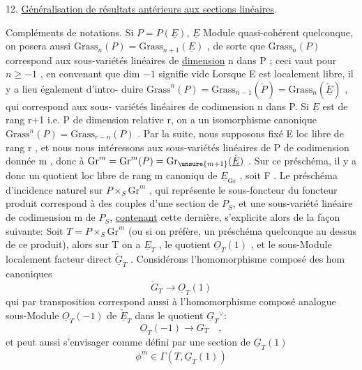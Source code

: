 
12. \uline{Généralisation de résultats antérieurs aux sections linéaires}.

Compléments de notations. Si $P = P(\underline{E})$, $\underline{E}$ Module quasi-cohérent
quelconque, on posera aussi $\mathrm{Grass}_n(P) = \mathrm{Grass}_{n+1}(\underline{E})$ , de sorte que
$\mathrm{Grass}_n(P)$ correspond aux sous-variétés linéaires de \uline{dimension} n dans
P ; ceci vaut pour $n \geq -1$ , en convenant que dim $-1$ signifie vide
Lorsque E est localement libre,  il y a lieu également d'intro-%
duire $\mathrm{Grass}^n(P) = \mathrm{Grass}_{n-1}(\check{P}) = \mathrm{Grass}_n(\check{\underline{E}})$ , qui correspond aux sous-%
variétés linéaires de codimension n dans P. Si $\underline{E}$ est de rang r+1 i.e.
P de dimension relative r, on a un isomorphisme canonique
$\mathrm{Grass}^n(P) = \mathrm{Grass}_{r-n}(P)$ . Par la suite, nous supposons fixé E loc
libre de rang r , et nous nous intéressons aux sous-variétés linéaires
de P de codimension donnée m , donc à $\mathrm{Gr}^m = \mathrm{Gr}^m(P) = \mathrm{Gr}_{\unsure{m+1}}(\check{\underline{E}})$ .
Sur ce préschéma, il y a donc un quotient  loc libre de rang m canoniqu
de $\underline{E}_{\mathrm{Gr}}$ , soit F .  Le préschéma d'incidence naturel
sur $P\times_S \mathrm{Gr}^m$ , qui représente le sous-foncteur du foncteur produit
correspond à des couples d'une section de $P_S$, et une sous-variété
linéaire de codimension m de $P_S$, \uline{contenant} cette dernière, s'explicite
alors de la façon suivante: Soit $T=P\times_S \mathrm{Gr}^m$ (ou si on préfère, un
préschéma quelconque au dessus de ce produit), alors sur  T on a
$\underline{E}_T$ , le quotient $\underline{O}_T(1)$ , et le sous-Module localement facteur direct
$\check{\underline{G}}_T$ . Considérons l'homomorphisme composé des hom canoniques
\[ \check{G}_T \longrightarrow \underline{O}_T(1) \]
qui par transposition correspond aussi à l'homomorphisme composé
analogue  sous-Module $\underline{O}_T(-1)$ de $\check{\underline{E}}_T$ dans le quotient $\underline{G}_T{}^{\vee}$:
\[ \underline{O}_T(-1) \longrightarrow G_T \quad , \]
et peut aussi s'envisager comme défini par une section de $\underline{G}_T(1)$
\[ \phi^m \in \Gamma(T, \underline{G}_T(1)) \]

